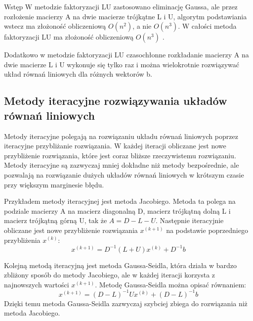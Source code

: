 \documentclass{article}
\begin{document}
\begin{section}{Wstęp}
    W metodzie faktoryzacji LU zastosowano eliminację Gaussa, ale przez rozłożenie macierzy A na dwie
    macierze trójkątne L i U, algorytm podstawiania wstecz ma złożoność obliczeniową $O(n^2)$\cite{wyklad1}, a nie $O(n^3)$.
    W całości metoda faktoryzacji LU ma złożoność obliczeniową $O(n^3)$ \cite{wyklad1}.

    Dodatkowo w metodzie faktoryzacji LU czasochłonne rozkładanie macierzy A na dwie macierze L i U
    wykonuje się tylko raz i można wielokrotnie rozwiązywać układ równań liniowych dla różnych wektorów b.

    \subsection{Metody iteracyjne rozwiązywania układów równań liniowych}
    Metody iteracyjne polegają na rozwiązaniu układu równań liniowych poprzez iteracyjne przybliżanie
    rozwiązania. W każdej iteracji obliczane jest nowe przybliżenie rozwiązania, które jest coraz bliższe
    rzeczywistemu rozwiązaniu. Metody iteracyjne są zazwyczaj mniej dokładne niż metody bezpośrednie, ale
    pozwalają na rozwiązanie dużych układów równań liniowych w krótszym czasie przy większym marginesie błędu.

    Przykładem metody iteracyjnej jest metoda Jacobiego. Metoda ta polega na podziale macierzy A na
    macierz diagonalną D, macierz trójkątną dolną L i macierz trójkątną górną U, tak że $A = D - L - U$.
    Następnie iteracyjnie obliczane jest nowe przybliżenie rozwiązania $x^{(k+1)}$ na podstawie poprzedniego
    przybliżenia $x^{(k)}$:
    \begin{equation}
        x^{(k+1)} = D^{-1}(L + U)x^{(k)} + D^{-1}b
    \end{equation} \cite{wyklad2}

    Kolejną metodą iteracyjną jest metoda Gaussa-Seidla, która działa w bardzo zbliżony sposób do metody
    Jacobiego, ale w każdej iteracji korzysta z najnowszych wartości $x^{(k+1)}$. Metodę Gaussa-Seidla
    można opisać równaniem:
    \begin{equation}
        x^{(k+1)} = (D - L)^{-1}Ux^{(k)} + (D - L)^{-1}b
    \end{equation} \cite{wyklad2}
    Dzięki temu metoda Gaussa-Seidla zazwyczaj szybciej zbiega do rozwiązania niż metoda Jacobiego.


\end{section}
\end{document}
